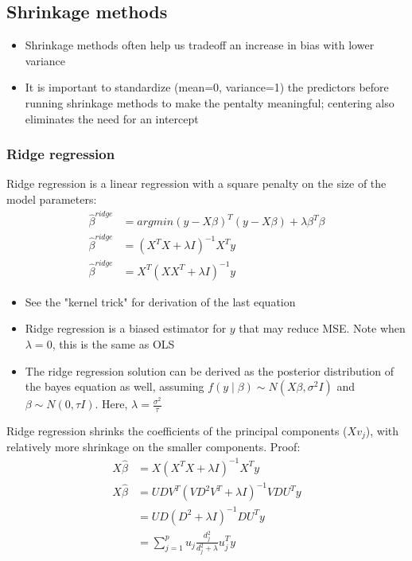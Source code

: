\documentclass{article}
\begin{document}
\subsection{Shrinkage methods}
\begin{itemize}
  \item Shrinkage methods often help us tradeoff an increase in bias with lower variance
  \item It is important to standardize (mean=0, variance=1) the predictors before running shrinkage methods to make the pentalty meaningful; centering also eliminates the need for an intercept
\end{itemize}
\subsubsection{Ridge regression}
Ridge regression is a linear regression with a square penalty on the size of the model parameters:
\begin{align*}
  \hat{\beta}^{ridge} &= argmin(y - X\beta)^T(y - X\beta) + \lambda\beta^T\beta\\
  \hat{\beta}^{ridge} &= (X^TX + \lambda I)^{-1}X^Ty\\
  \hat{\beta}^{ridge} &= X^T(XX^T + \lambda I)^{-1}y
\end{align*}
\begin{itemize}
  \item See the "kernel trick" for derivation of the last equation
  \item Ridge regression is a biased estimator for $y$ that may reduce MSE. Note when $\lambda = 0$, this is the same as OLS
  \item The ridge regression solution can be derived as the posterior distribution of the bayes equation as well, assuming $f(y \mid \beta) \sim N(X\beta, \sigma^2I)$ and $\beta \sim N(0, \tau I)$. Here, $\lambda = \frac{\sigma^2}{\tau}$
\end{itemize}
Ridge regression shrinks the coefficients of the principal components ($Xv_j$), with relatively more shrinkage on the smaller components. Proof:
\begin{align*}
  X\hat{\beta} &= X(X^TX + \lambda I)^{-1}X^Ty\\
  X\hat{\beta} &= UDV^T(VD^2V^T + \lambda I)^{-1}VDU^Ty\\
  &= UD(D^2 + \lambda I)^{-1}DU^Ty\\
  &= \sum_{j=1}^pu_j \frac{d_j^2}{d_j^2 + \lambda}u_j^Ty
\end{align*}
\end{document}
